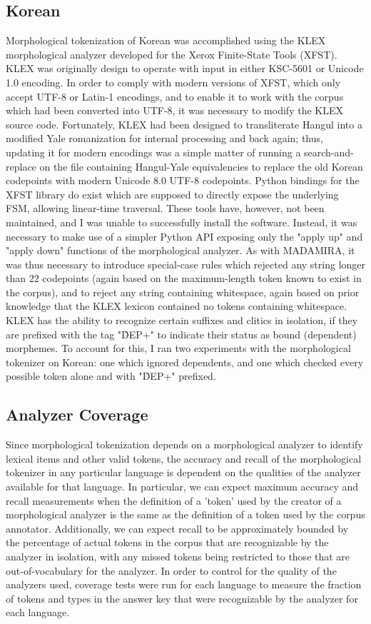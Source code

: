\subsection{Korean}
Morphological tokenization of Korean was accomplished using the KLEX morphological analyzer developed for the Xerox Finite-State Tools (XFST). KLEX was originally design to operate with input in either KSC-5601 or Unicode 1.0 encoding. In order to comply with modern versions of XFST, which only accept UTF-8 or Latin-1 encodings, and to enable it to work with the corpus which had been converted into UTF-8, it was necessary to modify the KLEX source code. Fortunately, KLEX had been designed to transliterate Hangul into a modified Yale romanization for internal processing and back again; thus, updating it for modern encodings was a simple matter of running a search-and-replace on the file containing Hangul-Yale equivalencies to replace the old Korean codepoints with modern Unicode 8.0 UTF-8 codepoints.
Python bindings for the XFST library do exist which are supposed to directly expose the underlying FSM, allowing linear-time traversal. These tools have, however, not been maintained, and I was unable to successfully install the software. Instead, it was necessary to make use of a simpler Python API exposing only the "apply up" and "apply down" functions of the morphological analyzer. As with MADAMIRA, it was thus necessary to introduce special-case rules which rejected any string longer than 22 codepoints (again based on the maximum-length token known to exist in the corpus), and to reject any string containing whitespace, again based on prior knowledge that the KLEX lexicon contained no tokens containing whitespace.
KLEX has the ability to recognize certain suffixes and clitics in isolation, if they are prefixed with the tag "\^DEP+" to indicate their status as bound (dependent) morphemes. To account for this, I ran two experiments with the morphological tokenizer on Korean: one which ignored dependents, and one which checked every possible token alone and with "\^DEP+" prefixed.

\subsection{Analyzer Coverage}
Since morphological tokenization depends on a morphological analyzer to identify lexical items and other valid tokens, the accuracy and recall of the morphological tokenizer in any particular language is dependent on the qualities of the analyzer available for that language. In particular, we can expect maximum accuracy and recall measurements when the definition of a 'token' used by the creator of a morphological analyzer is the same as the definition of a token used by the corpus annotator. Additionally, we can expect recall to be approximately bounded by the percentage of actual tokens in the corpus that are recognizable by the analyzer in isolation, with any missed tokens being restricted to those that are out-of-vocabulary for the analyzer.
In order to control for the quality of the analyzers used, coverage tests were run for each language to measure the fraction of tokens and types in the answer key that were recognizable by the analyzer for each language.

